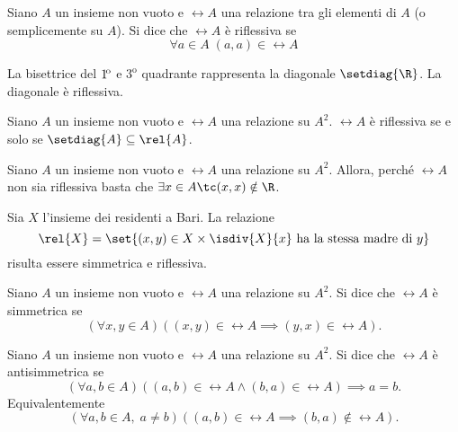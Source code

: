 \begin{definition}\label{def:relazione_riflessiva}
    Siano \(A\) un insieme non vuoto e \(\rel{A}\) una relazione tra gli elementi di \(A\) (o semplicemente su \(A\)). Si dice che \(\rel{A}\) è riflessiva se
    \[
        \forall a \in A \; (a, a) \in \rel{A}
    \]
\end{definition}

\begin{example}
    La bisettrice del \(1^\text{\!o}\) e \(3^\text{o}\) quadrante rappresenta la diagonale \(\setdiag{\R}\). La diagonale è riflessiva.
    
\end{example}

\begin{remark}
    Siano \(A\) un insieme non vuoto e \(\rel{A}\) una relazione su \(A^2\). \(\rel{A}\) è riflessiva se e solo se \(\setdiag{A} \subseteq \rel{A}\).
\end{remark}

\begin{remark}
    Siano \(A\) un insieme non vuoto e \(\rel{A}\) una relazione su \(A^2\). Allora, perché \(\rel{A}\) non sia riflessiva basta che \(\exists x \in A \tc (x, x) \notin \R\).
\end{remark}


\begin{example}
    Sia \(X\) l'insieme dei residenti a Bari. La relazione
    \[
        \rel{X} = \set{(x, y) \in X \times \isdiv{X}{x} \text{ ha la stessa madre di } y} 
    \]
    risulta essere simmetrica e riflessiva.
\end{example}

\begin{definition}\label{def:relazione_simmetrica}
    Siano \(A\) un insieme non vuoto e \(\rel{A}\) una relazione su \(A^2\). Si dice che \(\rel{A}\) è simmetrica se
    \[
        \left(\forall x,y \in A\right)\left((x, y) \in \rel{A} \implies (y, x) \in \rel{A} \right).
    \]
\end{definition}

\begin{definition}\label{def:relazione_antisimmetrica}
    Siano \(A\) un insieme non vuoto e \(\rel{A}\) una relazione su \(A^2\). Si dice che \(\rel{A}\) è antisimmetrica se
    \[
        \left(\forall a,b \in A\right) \left((a, b) \in \rel{A} \land (b, a) \in \rel{A}\right) \implies a = b.
    \]
    Equivalentemente
    \[
        (\forall a,b \in A, \; a \neq b) \left((a, b) \in \rel{A} \implies (b, a) \notin \rel{A}\right).
    \]
\end{definition}

